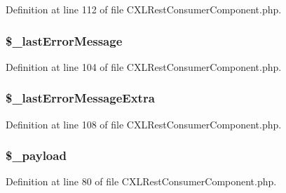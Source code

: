 Definition at line 112 of file CXLRestConsumerComponent.php.

\hypertarget{classCXLRestConsumerComponent_a204d1af51663d8a1317949e796fe5fca}{
\subsubsection[{\$\_\-lastErrorMessage}]{\setlength{\rightskip}{0pt plus 5cm}\$\_\-lastErrorMessage}}
\label{classCXLRestConsumerComponent_a204d1af51663d8a1317949e796fe5fca}


Definition at line 104 of file CXLRestConsumerComponent.php.

\hypertarget{classCXLRestConsumerComponent_a15913094186791f856e0e5eb23883ba3}{
\subsubsection[{\$\_\-lastErrorMessageExtra}]{\setlength{\rightskip}{0pt plus 5cm}\$\_\-lastErrorMessageExtra}}
\label{classCXLRestConsumerComponent_a15913094186791f856e0e5eb23883ba3}


Definition at line 108 of file CXLRestConsumerComponent.php.

\hypertarget{classCXLRestConsumerComponent_a01bc135256923b2605138f01e3f81d76}{
\subsubsection[{\$\_\-payload}]{\setlength{\rightskip}{0pt plus 5cm}\$\_\-payload}}
\label{classCXLRestConsumerComponent_a01bc135256923b2605138f01e3f81d76}


Definition at line 80 of file CXLRestConsumerComponent.php.

